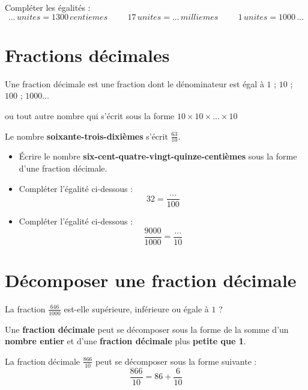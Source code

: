 \documentclass[a4paper,dvipsnames]{article}
\begin{document}
\begin{ExOApp}[]
Compléter les égalités :
\[...\,unites=1300\,centiemes\hspace{1cm}17 \,unites=...\,milliemes\hspace{1cm}1\,unites=1000\,...\]
\end{ExOApp}

\section{Fractions décimales}

\begin{Def}
Une fraction décimale est une fraction dont le dénominateur est égal à $1$ ; $10$ ; $100$ ; $1000$...

ou tout autre nombre qui s'écrit sous la forme $10\times10\times...\times10$
\end{Def}

\begin{Ex}
Le nombre \textbf{soixante-trois-dixièmes} s'écrit $\frac{63}{10}$.
\end{Ex}

\begin{ExOApp}[]
\begin{itemize}
\item Écrire le nombre \textbf{six-cent-quatre-vingt-quinze-centièmes} sous la forme d'une fraction décimale.
\item Compléter l'égalité ci-dessous :
\[32=\frac{...}{100}\]
\item Compléter l'égalité ci-dessous :
\[\frac{9000}{1000}=\frac{...}{10}\]
\end{itemize}
\end{ExOApp}

\section{Décomposer une fraction décimale}

\begin{ExOApp}[]
La fraction $\frac{646}{1000}$ est-elle supérieure, inférieure ou égale à $1$ ?
\end{ExOApp}

\begin{Def}
Une \textbf{fraction décimale} peut se décomposer sous la forme de la somme d'un \textbf{nombre entier} et d'une \textbf{fraction décimale} plus \textbf{petite que 1}.
\end{Def}

\begin{Ex}
La fraction décimale $\frac{866}{10}$ peut se décomposer sous la forme suivante :
\[\frac{866}{10}=86+\frac{6}{10}\]
\end{Ex}
\end{document}
